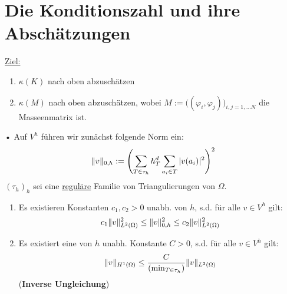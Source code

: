 \section{Die Konditionszahl und ihre Abschätzungen}
\underline{Ziel:} 
\begin{enumerate}
\item $\kappa (K)$ nach oben abzuschätzen
\item $\kappa (M)$ nach oben abzuschätzen, wobei $M:= \big((\varphi_i,\varphi_j)\big)_{i,j=1,\dots N}$ die Masseenmatrix ist.
\end{enumerate}•
Auf $V^h$ führen wir zunächst folgende Norm ein:
\[ \|v\|_{0,h} := \left( \sum_{T \in \tau_h} h^d_T \sum_{a_i \in T} |v(a_i)|^2 \right)^2 \]
$(\tau_h)_h$ sei eine \underline{reguläre} Familie von Triangulierungen von $\Omega$.

\begin{satz}
\begin{enumerate}
\item
 Es existieren Konstanten $c_1,c_2 >0$ unabh. von $h$, s.d. für alle $v \in V^h$ gilt:
\[ c_1 \|v\|^2_{L^2(\Omega)} \leq \|v\|^2_{0,h} \leq c_2 \|v\|^2_{L^2(\Omega)} \]
\item
Es existiert eine von $h$ unabh. Konstante $C>0$, s.d. für alle $v \in V^h$ gilt:
\[ \|v\|_{H^1(\Omega)} \leq \frac{C}{(\min_{T \in \tau_h})} \|v\|_{L^2(\Omega)} \]
(\textbf{Inverse Ungleichung})
\end{enumerate}
\end{satz}



